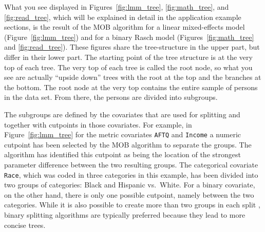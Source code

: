 \documentclass[doc,floatsintext,natbib]{apa7}
\begin{document}
What you see displayed in Figures~\ref{fig:lmm_tree}, \ref{fig:math_tree}, and \ref{fig:read_tree}, which will be explained in detail in the application example sections, is the result of the MOB algorithm for a linear mixed-effects model (Figure~\ref{fig:lmm_tree}) and for a binary Rasch model (Figures~\ref{fig:math_tree} and \ref{fig:read_tree}). These figures share the tree-structure in the upper part, but differ in their lower part. The starting point of the tree structure is at the very top of each tree. The very top of each tree is called the root node, so what you see are actually ``upside down'' trees with the root at the top and the branches at the 
bottom. The root node at the very top contains the entire sample of persons in the data set. From there, the persons are divided into subgroups.

The subgroups are defined by the covariates that are used for splitting and together with cutpoints in those covariates. For example, in Figure~\ref{fig:lmm_tree} for the metric covariates \texttt{AFTQ} and \texttt{Income} a numeric cutpoint has been selected by the MOB algorithm to separate the groups. The algorithm has identified this cutpoint as being the location of the strongest parameter difference between the two resulting groups. The categorical covariate \texttt{Race}, which was coded in three categories in this example, has been divided into two groups of categories: Black and Hispanic vs.~White. For a binary covariate,  
on the other hand, there is only one possible cutpoint, namely between the two categories. While it is also possible to create more than two groups in each split \citep{KimLoh:2001,Qui:1993}, binary splitting algorithms are typically preferred because they lead to more concise trees. 
\end{document}
